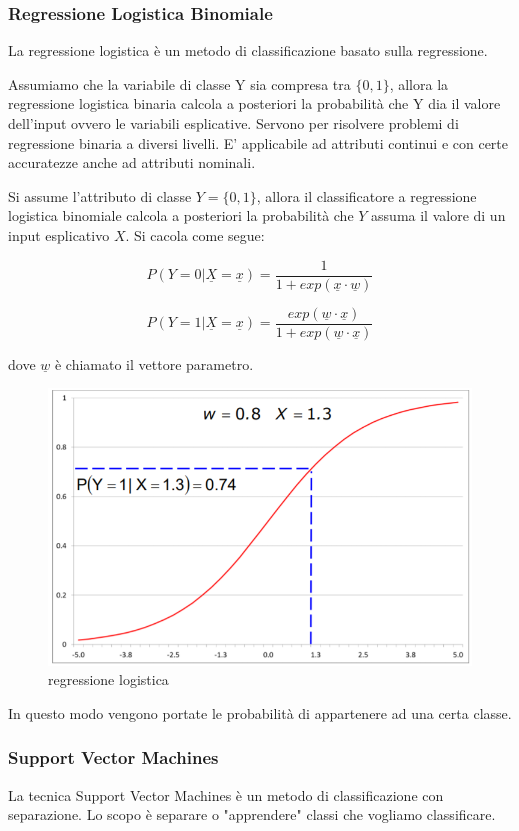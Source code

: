 \subsubsection{Regressione Logistica Binomiale}
La regressione logistica è un metodo di classificazione basato sulla regressione.

Assumiamo che la variabile di classe Y sia compresa tra $\{0,1\}$, allora la regressione logistica binaria calcola a posteriori la probabilità che Y dia il valore dell'input ovvero le variabili esplicative.
Servono per risolvere problemi di regressione binaria a diversi livelli. E' applicabile ad attributi continui e con certe accuratezze anche ad attributi nominali.

Si assume l'attributo di classe $Y = \{0,1\}$, allora il classificatore a regressione logistica binomiale calcola a posteriori la probabilit\`a che $Y$ assuma il valore di un input esplicativo \underline{$X$}. Si cacola come segue:

\[P(Y = 0 | \underline{X}= \underline{x}) = \frac{1}{1+exp(\underline{x} \cdot \underline{w})}\]

\[P(Y = 1 | \underline{X}= \underline{x}) = \frac{exp(\underline{w} \cdot \underline{x})}{1+exp(\underline{w} \cdot \underline{x})}\]

dove $\underline{w}$ \`e chiamato il vettore parametro.

\begin{figure}[H]
	\centering
	\includegraphics[height=0.5 \linewidth]{classification/pict/regr_logistic.png}
	\caption{regressione logistica}
\end{figure}

In questo modo vengono portate le probabilità di appartenere ad una certa classe.	 

\subsubsection{Support Vector Machines}
La tecnica Support Vector Machines è un metodo di classificazione con separazione. Lo scopo \`e separare o "apprendere" classi che vogliamo classificare. 

